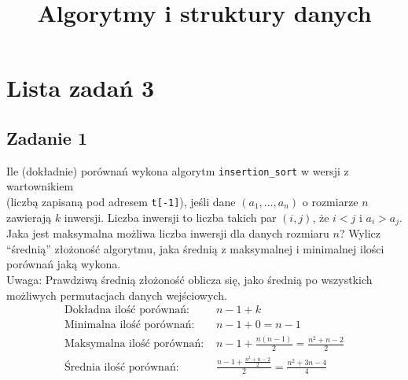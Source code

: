 \documentclass{article}
\begin{document}
\title{Algorytmy i struktury danych}
\author{}
\date{}
\maketitle

\section*{Lista zadań 3}

\subsection*{Zadanie 1}
Ile (dokładnie) porównań wykona algorytm \verb|insertion_sort| w wersji z wartownikiem \\
(liczbą zapisaną pod adresem \verb|t[-1]|), jeśli dane $(a_1, \dots, a_n)$ o rozmiarze $n$ zawierają
$k$ inwersji. Liczba inwersji to liczba takich par $(i, j)$, że $i < j$ i $a_i > a_j$. Jaka jest
maksymalna możliwa liczba inwersji dla danych rozmiaru $n$? Wylicz “średnią” złożoność algorytmu,
jaka średnią z maksymalnej i minimalnej ilości porównań jaką wykona. \\
Uwaga: Prawdziwą średnią złożoność oblicza się, jako średnią po wszystkich możliwych
permutacjach danych wejściowych.
\begin{align*}
    \text{Dokładna ilość porównań: }   & n-1 + k                                                        \\
    \text{Minimalna ilość porównań: }  & n-1 + 0 = n-1                                                  \\
    \text{Maksymalna ilość porównań: } & n-1 + \frac{n(n-1)}{2} = \frac{n^2 + n - 2}{2}                 \\
    \text{Średnia ilość porównań: }    & \frac{n-1 + \frac{n^2 + n - 2}{2}}{2} = \frac{n^2 + 3n - 4}{4}
\end{align*}
\end{document}
